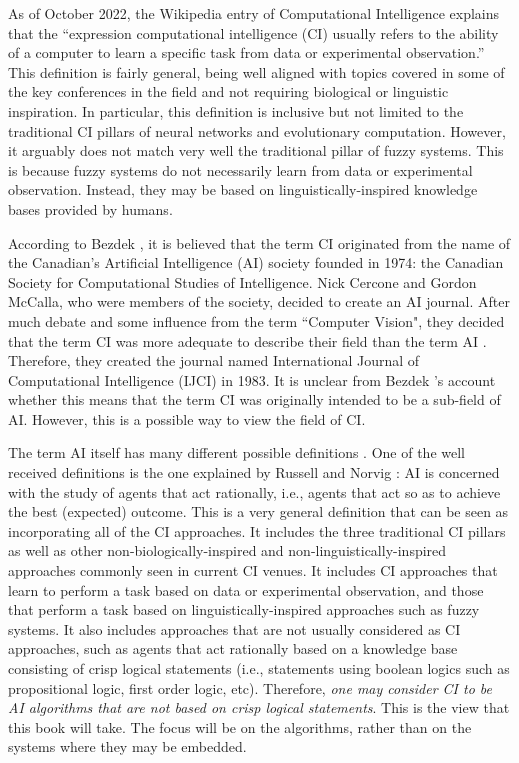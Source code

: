 As of October 2022, the Wikipedia entry of Computational Intelligence \cite{ciswiki} explains that the ``expression computational intelligence (CI) usually refers to the ability of a computer to learn a specific task from data or experimental observation.'' This definition is fairly general, being well aligned with topics covered in some of the key conferences in the field and not requiring biological or linguistic inspiration. In particular, this definition is inclusive but not limited to the traditional CI pillars of neural networks and evolutionary computation. However, it arguably does not match very well the traditional pillar of fuzzy systems. This is because fuzzy systems do not necessarily learn from data or experimental observation. Instead, they may be based on linguistically-inspired knowledge bases provided by humans. 

According to Bezdek \cite{Bezdek}, it is believed that the term CI originated from the name of the Canadian's Artificial Intelligence (AI) society founded in 1974: the Canadian Society for Computational Studies of Intelligence. Nick Cercone and Gordon McCalla, who were members of the society, decided to create an AI journal. After much debate and some influence from the term ``Computer Vision", they decided that the term CI was more adequate to describe their field than the term AI \cite{Bezdek}. Therefore, they created the journal named International Journal of Computational Intelligence (IJCI) in 1983. It is unclear from Bezdek \cite{Bezdek}'s account whether this means that the term CI was originally intended to be a sub-field of AI. However, this is a possible way to view the field of CI.

The term AI itself has many different possible definitions \cite{RussellNorvig}. One of the well received definitions is the one explained by Russell and Norvig \cite{RussellNorvig}: AI is concerned with the study of agents that act rationally, i.e., agents that act so as to achieve the best (expected) outcome. This is a very general definition that can be seen as incorporating all of the CI approaches. It includes the three traditional CI pillars as well as other non-biologically-inspired and non-linguistically-inspired approaches commonly seen in current CI venues. It includes CI approaches that learn to perform a task based on data or experimental observation, and those that perform a task based on linguistically-inspired approaches such as fuzzy systems.  It also includes approaches that are not usually considered as CI approaches, such as agents that act rationally based on a knowledge base consisting of crisp logical statements (i.e., statements using boolean logics such as propositional logic, first order logic, etc). Therefore, \textit{one may consider CI to be AI algorithms that are not based on crisp logical statements}. This is the view that this book will take. The focus will be on the algorithms, rather than on the systems where they may be embedded.

